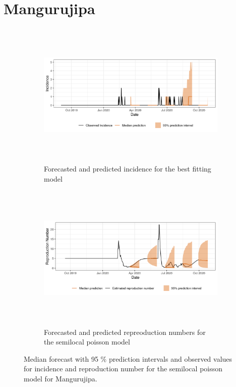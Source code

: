  \section{ Mangurujipa }\begin{figure}[H]\begin{subfigure}{\textwidth}  \centering  \includegraphics[width=0.9\linewidth, height=7cm]{../output/Mangurujipa_predictions.png}  \caption{Forecasted and predicted incidence for the best fitting model}\end{subfigure}

\begin{subfigure}{\textwidth}  \centering  \includegraphics[width=0.9\linewidth, height=7cm]{../output/Mangurujipa_Rs.png}  \caption{Forecasted and predicted repreoduction numbers for the semilocal poisson model}\end{subfigure}  \caption{Median forecast with 95 \% prediction intervals and observed values for incidence and reproduction number for the semilocal poisson model for Mangurujipa.}\end{figure}

